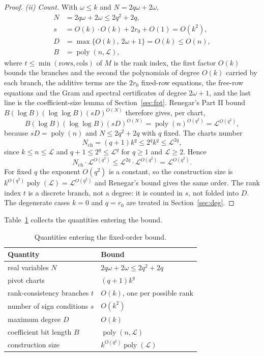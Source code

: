 \begin{proof}
\emph{(ii) Count.} With $\omega\le k$ and $N=2q\omega+2\omega$,
\[
\begin{aligned}
N &= 2q\omega+2\omega\le 2q^2+2q,\\
s &= O(k)\cdot O(k)+2r_0+O(1)=O(k^2),\\
D &= \max\{O(k),\,2\omega+1\}=O(k)\le O(n),\\
B &= \operatorname{poly}(n,\mathcal L),
\end{aligned}
\]
where $t\le\min(\text{rows},\text{cols})$ of $M$ is the rank index, the first
factor $O(k)$ bounds the branches and the second the polynomials of degree
$O(k)$ carried by each branch, the additive terms are the $2r_0$ fixed-row
equations, the free-row equations and the Gram and spectral certificates of
degree $2\omega+1$, and the last line is the coefficient-size lemma of
Section~\ref{sec:fpt}. Renegar's Part II bound
$B(\log B)(\log\log B)(sD)^{O(N)}$ therefore gives, per chart,
\[
B(\log B)(\log\log B)(sD)^{O(N)}
=\operatorname{poly}(n)^{O(q^2)}
=\mathcal L^{O(q^2)},
\]
because $sD=\operatorname{poly}(n)$ and $N\le 2q^2+2q$ with $q$ fixed. The
charts number
\[
N_{\mathrm{ch}}=(q+1)k^{q}\le 2^{q}k^{q}\le\mathcal L^{2q},
\]
since $k\le n\le\mathcal L$ and $q+1\le 2^{q}\le\mathcal L^{q}$ for $q\ge1$
and $\mathcal L\ge2$. Hence
\[
N_{\mathrm{ch}}\cdot\mathcal L^{O(q^2)}
\le\mathcal L^{2q}\cdot\mathcal L^{O(q^2)}
=\mathcal L^{O(q^2)} .
\]
For fixed $q$ the exponent $O(q^2)$ is a constant, so the construction size is
$k^{O(q^2)}\operatorname{poly}(\mathcal L)=\mathcal L^{O(q^2)}$ and Renegar's
bound gives the same order. The rank index $t$ is a discrete branch, not a
degree: it is counted in $s$, not folded into $D$. The degenerate cases $k=0$
and $q=r_0$ are treated in Section~\ref{sec:deg}.
\end{proof}

Table~\ref{tab:4} collects the quantities entering the bound.

\begin{table}[!t]
\centering
\caption{Quantities entering the fixed-order bound.}\label{tab:4}
\small
\begin{tabular}{p{}p{}}
\toprule
Quantity & Bound \\
\midrule
real variables $N$ & $2q\omega+2\omega\le2q^2+2q$ \\
pivot charts & $(q+1)k^q$ \\
rank-consistency branches $t$ & $O(k)$, one per possible rank \\
number of sign conditions $s$ & $O(k^2)$ \\
maximum degree $D$ & $O(k)$ \\
coefficient bit length $B$ & $\operatorname{poly}(n,\mathcal L)$ \\
construction size & $k^{O(q^2)}\operatorname{poly}(\mathcal L)$ \\
\bottomrule
\end{tabular}
\end{table}

